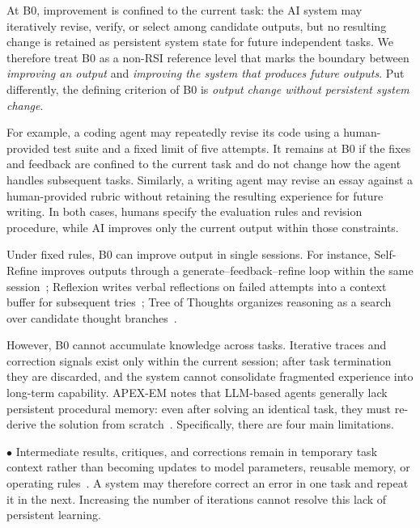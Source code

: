 At B0, improvement is confined to the current task: the AI system may iteratively revise, verify, or select among candidate outputs, but no resulting change is retained as persistent system state for future independent tasks. We therefore treat B0 as a non-RSI reference level that marks the boundary between \emph{improving an output} and \emph{improving the system that produces future outputs}. Put differently, the defining criterion of B0 is \emph{output change without persistent system change}.


\clearpage

For example, a coding agent may repeatedly revise its code using a human-provided test suite and a fixed limit of five attempts. It remains at B0 if the fixes and feedback are confined to the current task and do not change how the agent handles subsequent tasks. Similarly, a writing agent may revise an essay against a human-provided rubric without retaining the resulting experience for future writing. In both cases, humans specify the evaluation rules and revision procedure, while AI improves only the current output within those constraints.





Under fixed rules, B0 can improve output in single sessions. For instance, Self-Refine improves outputs through a generate–feedback–refine loop within the same session~\cite{madaan2023self}; Reflexion writes verbal reflections on failed attempts into a context buffer for subsequent tries~\cite{shinn2023reflexionlanguageagentsverbal}; Tree of Thoughts organizes reasoning as a search over candidate thought branches~\cite{yao2023tree}. 

However, B0 cannot accumulate knowledge across tasks. Iterative traces and correction signals exist only within the current session; after task termination they are discarded, and the system cannot consolidate fragmented experience into long-term capability. APEX-EM notes that LLM-based agents generally lack persistent procedural memory: even after solving an identical task, they must re-derive the solution from scratch~\cite{banerjee2026apexemnonparametriconlinelearning}. Specifically, there are four main limitations.




\noindent$\bullet$  Intermediate results, critiques, and corrections remain in temporary task context rather than becoming updates to model parameters, reusable memory, or operating rules~\cite{zhao2024expel}. A system may therefore correct an error in one task and repeat it in the next. Increasing the number of iterations cannot resolve this lack of persistent learning.

